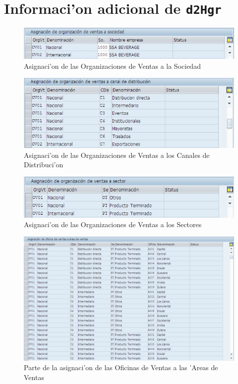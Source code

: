 \chapter{Informaci'on adicional de {\tt d2Hgr}}

\begin{figure}[htb]
\centering
\includegraphics[scale=0.65,type=jpg,ext=.jpg,read=.jpg]{figures/OrgVentasSociedad}
\caption{Asignaci'on de las Organizaciones de Ventas a la Sociedad}
\label{fig:asigna1}
\end{figure}
\begin{figure}[htb]
\centering
\includegraphics[scale=0.65,type=jpg,ext=.jpg,read=.jpg]{figures/OrgVentasCanales}
\caption{Asignaci'on de las Organizaciones de Ventas a los Canales de Distribuci'on}
\label{fig:asigna2}
\end{figure}
\begin{figure}[htb]
\centering
\includegraphics[scale=0.65,type=jpg,ext=.jpg,read=.jpg]{figures/OrgVentasSector}
\caption{Asignaci'on de las Organizaciones de Ventas a los Sectores}
\label{fig:asigna3}
\end{figure}
\begin{figure}[htb]
\centering
\includegraphics[scale=0.65,type=jpg,ext=.jpg,read=.jpg]{figures/OfVentaAreas}
\caption{Parte de la asignaci'on de las Oficinas de Ventas a las 'Areas de Ventas}
\label{fig:asigna4}
\end{figure}
